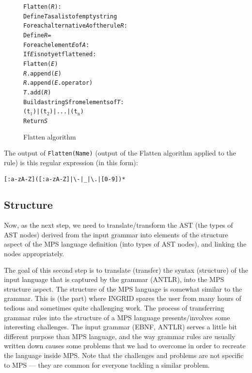 \begin{figure}[ht]
\centering
\begin{framed}
\begin{alltt}
Flatten(\textit{R}):
  Define \textit{T} as a list of empty string
  For each alternative \textit{A} of the rule \textit{R}:
    Define \textit{R} = \antlrap\antlrap
    For each element \textit{E} of \textit{A}:
	  If \textit{E} is not yet flattened:
	    Flatten(\textit{E})
      \textit{R}.append(\textit{E})
      \textit{R}.append(\textit{E}.operator)
    \textit{T}.add(\textit{R})
  Build a string S from elements of \textit{T}:
    (t$_{\text{1}}$)|(t$_{\text{2}}$)|...|(t$_{\text{n}}$)
  Return \textit{S}
\end{alltt}
\end{framed}
\caption{Flatten algorithm}
\label{fig:algflatten}
\end{figure}

The output of \texttt{Flatten(Name)} (output of the Flatten algorithm applied to the  rule) is this regular expression (in this form):

\begin{center}
	\texttt{[:a-zA-Z]([:a-zA-Z]|\textbackslash-|{\_}|\textbackslash.|[0-9])*}
\end{center}

\subsection{Structure}

Now, as the next step, we need to translate/transform the AST (the types of AST nodes) derived from the input grammar into elements of the structure aspect of the MPS language definition (into types of AST nodes), and linking the nodes appropriately.

The goal of this second step is to translate (transfer) the syntax (structure) of the input language that is captured by the grammar (ANTLR), into the MPS structure aspect.
The structure of the MPS language is somewhat similar to the grammar.
This is (the part) where INGRID spares the user from many hours of tedious and sometimes quite challenging work.
The process of transferring grammar rules into the structure of a MPS language presents/involves some interesting challenges.
The input grammar (EBNF, ANTLR) serves a little bit different purpose than MPS language, and the way grammar rules are usually written down causes some problems that we had to overcome in order to recreate the language inside MPS.
Note that the challenges and problems are not specific to MPS --- they are common for everyone tackling a similar problem.

